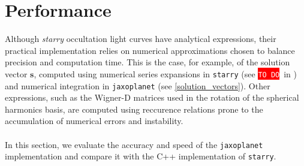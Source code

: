 \documentclass[modern]{aastex631}
\newcommand{\todo}[1]{\colorbox{red}{\textcolor{white}{\texttt{TO DO}}}\,}
\begin{document}
\section{Performance}\label{performances}
Although \textit{starry} occultation light curves have analytical expressions, their practical implementation relies on numerical approximations chosen to balance precision and computation time. This is the case, for example, of the solution vector $\bm{s}$, computed using numerical series expansions in \texttt{starry} (see \todo{} in \citealt{starry}) and numerical integration in \texttt{jaxoplanet} (see \autoref{solution_vectors}). Other expressions, such as the Wigner-D matrices used in the rotation of the spherical harmonics basis, are computed using reccurence relations prone to the accumulation of numerical errors and instability.\\\\
In this section, we evaluate the accuracy and speed of the \texttt{jaxoplanet} implementation and compare it with the C++ implementation of \texttt{starry}.
\end{document}
